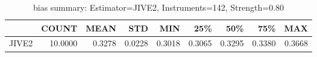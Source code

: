 \begin{table}[ht]
\centering
\caption{bias summary: Estimator=JIVE2, Instruments=142, Strength=0.80}
\begin{tabular}{lrrrrrrrr}
\toprule
 & COUNT & MEAN & STD & MIN & 25\% & 50\% & 75\% & MAX \\
\midrule
JIVE2 & 10.0000 & 0.3278 & 0.0228 & 0.3018 & 0.3065 & 0.3295 & 0.3380 & 0.3668 \\
\bottomrule
\end{tabular}
\end{table}
